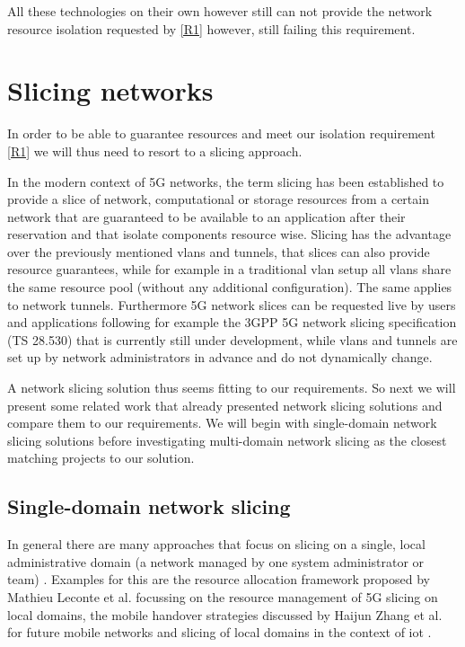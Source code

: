 All these technologies on their own however still can not provide the network resource isolation requested by \ref{R1} however, still failing this requirement.


\section{Slicing networks}
In order to be able to guarantee resources and meet our isolation requirement \ref{R1} we will thus need to resort to a slicing approach.

In the modern context of 5G networks, the term slicing has been established to provide a slice of network, computational or storage resources from a certain network that are guaranteed to be available to an application after their reservation \cite{5G1,5G2,5G3} and that isolate components resource wise. Slicing has the advantage over the previously mentioned \acrshort{vlan}s and tunnels, that slices can also provide resource guarantees, while for example in a traditional \acrshort{vlan} setup all \acrshort{vlan}s share the same resource pool (without any additional configuration). The same applies to network tunnels. Furthermore 5G network slices can be requested live by users and applications following for example the 3GPP 5G network slicing specification (TS 28.530) \cite{3gpp28.530} that is currently still under development, while \acrshort{vlan}s and tunnels are set up by network administrators in advance and do not dynamically change.

A network slicing solution thus seems fitting to our requirements. So next we will present some related work that already presented network slicing solutions and compare them to our requirements. We will begin with single-domain network slicing solutions before investigating multi-domain network slicing as the closest matching projects to our solution.

\subsection{Single-domain network slicing} In general there are many approaches that focus on slicing on a single, local administrative domain (a network managed by one system administrator or team)  \cite{SD1,SD2,SD3}. Examples for this are the resource allocation framework proposed by Mathieu Leconte et al. \cite{SD3} focussing on the resource management of 5G slicing on local domains, the mobile handover strategies discussed by Haijun Zhang et al. \cite{SD1} for future mobile networks and slicing of local domains in the context of \acrshort{iot} \cite{SD2}.

